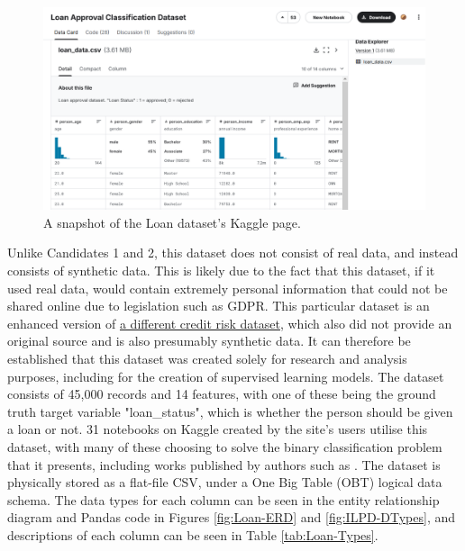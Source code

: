 \documentclass[12pt]{report}
\begin{document}
\begin{figure}[H]
    \centering
    \includegraphics[width=.75\linewidth]{Loan-Kaggle.png}
    \caption{A snapshot of the Loan dataset's Kaggle page.}
    \label{fig:Loan-Kaggle}
\end{figure}

Unlike Candidates 1 and 2, this dataset does not consist of real data, and 
instead consists of synthetic data. This is likely due to the fact that this dataset, if it used real data, would contain extremely personal 
information that could not be shared online due to legislation such as GDPR. This particular dataset is an enhanced version of \href{https://www.kaggle.com/datasets/laotse/credit-risk-dataset}{a different credit risk dataset},
which also did not provide an original source and is also presumably synthetic data. It can therefore be established that this dataset 
was created solely for research and analysis purposes, including for the creation of supervised learning models. 
The dataset consists of 45,000 records and 14 features, with 
one of these being the ground truth target variable "loan\_status", which is whether the person should be given a loan or not. 
31 notebooks on Kaggle created by the site's users utilise this dataset, with many of these choosing to solve the binary classification 
problem that it presents, including works published by authors such as \autocite{gupta_loanification_2021}. 
The dataset is physically stored as a flat-file CSV, under a One Big Table (OBT) logical data schema.
The data types for each column can be seen in the entity relationship diagram and Pandas code in Figures \ref{fig:Loan-ERD} and \ref{fig:ILPD-DTypes}, and 
descriptions of each column can be seen in Table \ref{tab:Loan-Types}.
\end{document}
